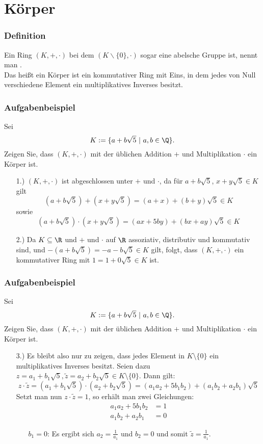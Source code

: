 \section{Körper}
%
\begin{frame}\frametitle{Definition}
	Ein Ring $(K,+,\cdot)$ bei dem $(K\backslash\{0\},\cdot)$ sogar eine abelsche Gruppe ist, nennt man .\\\vspace{3mm}
	Das heißt ein Körper ist ein kommutativer Ring mit Eins, in dem jedes von Null verschiedene Element ein multiplikatives Inverses besitzt.\\
\end{frame}
%
%
\begin{frame}\frametitle{Aufgabenbeispiel}
Sei
$$
	K := \{ a + b\sqrt{5} ~|~a,b \in \Q \}. 
$$
Zeigen Sie, dass $(K,+,\cdot)$ mit der \"ublichen Addition $+$ und Multiplikation $\cdot$ ein  K\"orper ist.\\\vfill\pause
{}
\begin{itemize}
\item[1.)] $(K,+,\cdot)$ ist abgeschlossen unter $+$ und $\cdot$, da für $a+b\sqrt{5}$, $x+y\sqrt{5} \in K$ gilt
$$
(a+b\sqrt{5})+(x+y\sqrt{5})=(a+x)+(b+y)\sqrt{5} \in K
$$
sowie 
$$
(a+b\sqrt{5})\cdot(x+y\sqrt{5})=(ax+5by)+(bx+ay)\sqrt{5} \in K
$$\pause
\item[2.)] Da $K \subseteq \R$ und $+$ und $\cdot$ auf $\R$ assoziativ, distributiv und kommutativ sind, und $-(a+b\sqrt{5})=-a-b\sqrt{5} \in K$ gilt, folgt, dass $(K,+,\cdot)$ ein kommutativer Ring mit $1=1+0\sqrt{5} \in K$ ist.
\end{itemize}
\end{frame}
%
\begin{frame}\frametitle{Aufgabenbeispiel}
Sei
$$
	K := \{ a + b\sqrt{5} ~|~a,b \in \Q \}. 
$$
Zeigen Sie, dass $(K,+,\cdot)$ mit der \"ublichen Addition $+$ und Multiplikation $\cdot$ ein  K\"orper ist.\\\vfill
{}
\begin{itemize}
\item[3.)] Es bleibt also nur zu zeigen, dass jedes Element in $K \setminus \{0\}$ ein multiplikatives Inverses besitzt. \pause Seien dazu $z=a_1 + b_1 \sqrt{5}, \tilde z=a_2+b_2\sqrt{5} \in K\setminus \{0\}$. Dann gilt:
$$
z \cdot \tilde z =(a_1 + b_1\sqrt{5}) \cdot (a_2 + b_2\sqrt{5}) = (a_1a_2 + 5b_1b_2) + (a_1b_2 + a_2b_1)\sqrt{5}
$$
Setzt man nun $z \cdot \tilde z=1$, so erh\"alt man zwei Gleichungen:
\begin{align*}
a_1a_2 + 5b_1b_2&=1\\
a_1b_2 + a_2b_1&=0
\end{align*}
\begin{itemize}
\item[$b_1=0$:]
Es ergibt sich $a_2=\frac{1}{a_1}$ und $b_2=0$ und somit $\tilde z = \frac{1}{a_1}$.
\end{itemize}
\end{itemize}
\end{frame}
